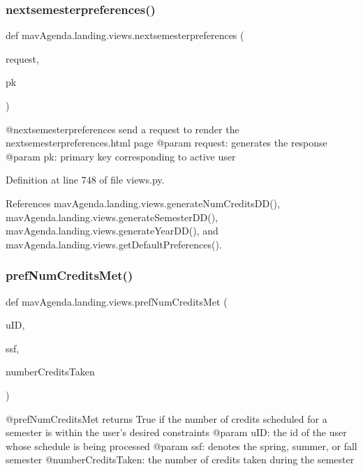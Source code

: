 \subsubsection{\texorpdfstring{nextsemesterpreferences()}{nextsemesterpreferences()}}
{\footnotesize\ttfamily def mav\+Agenda.\+landing.\+views.\+nextsemesterpreferences (\begin{DoxyParamCaption}\item[{}]{request,  }\item[{}]{pk }\end{DoxyParamCaption})}

\begin{DoxyVerb}@nextsemesterpreferences send a request to render the nextsemesterpreferences.html page
@param request: generates the response
@param pk: primary key corresponding to active user
\end{DoxyVerb}
 

Definition at line 748 of file views.\+py.



References mav\+Agenda.\+landing.\+views.\+generate\+Num\+Credits\+D\+D(), mav\+Agenda.\+landing.\+views.\+generate\+Semester\+D\+D(), mav\+Agenda.\+landing.\+views.\+generate\+Year\+D\+D(), and mav\+Agenda.\+landing.\+views.\+get\+Default\+Preferences().

\mbox{\label{namespacemavAgenda_1_1landing_1_1views_a0244061e7eb138b3657aebe21a1cefbe}} 
\subsubsection{\texorpdfstring{pref\+Num\+Credits\+Met()}{prefNumCreditsMet()}}
{\footnotesize\ttfamily def mav\+Agenda.\+landing.\+views.\+pref\+Num\+Credits\+Met (\begin{DoxyParamCaption}\item[{}]{u\+ID,  }\item[{}]{ssf,  }\item[{}]{number\+Credits\+Taken }\end{DoxyParamCaption})}

\begin{DoxyVerb}@prefNumCreditsMet returns True if the number of credits scheduled for a semester is within the user's desired constraints
@param uID: the id of the user whose schedule is being processed
@param ssf: denotes the spring, summer, or fall semester
@numberCreditsTaken: the number of credits taken during the semester
\end{DoxyVerb}
 

